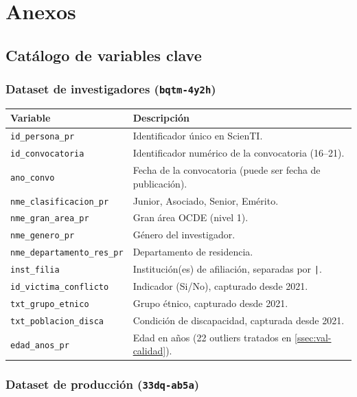 \documentclass[11pt,a4paper,oneside]{article}
\begin{document}
\appendix
\section*{Anexos}
\renewcommand{\thesubsection}{\Alph{subsection}}

\subsection{Catálogo de variables clave}

\subsubsection*{Dataset de investigadores (\texttt{bqtm-4y2h})}

\begin{tabularx}{\linewidth}{l X}
\toprule
\textbf{Variable} & \textbf{Descripción} \\
\midrule
\texttt{id\_persona\_pr} & Identificador único en ScienTI. \\
\texttt{id\_convocatoria} & Identificador numérico de la convocatoria (16--21). \\
\texttt{ano\_convo} & Fecha de la convocatoria (puede ser fecha de publicación). \\
\texttt{nme\_clasificacion\_pr} & Junior, Asociado, Senior, Emérito. \\
\texttt{nme\_gran\_area\_pr} & Gran área OCDE (nivel 1). \\
\texttt{nme\_genero\_pr} & Género del investigador. \\
\texttt{nme\_departamento\_res\_pr} & Departamento de residencia. \\
\texttt{inst\_filia} & Institución(es) de afiliación, separadas por \texttt{|}. \\
\texttt{id\_victima\_conflicto} & Indicador (Si/No), capturado desde 2021. \\
\texttt{txt\_grupo\_etnico} & Grupo étnico, capturado desde 2021. \\
\texttt{txt\_poblacion\_disca} & Condición de discapacidad, capturada desde 2021. \\
\texttt{edad\_anos\_pr} & Edad en años (22 outliers tratados en \ref{ssec:val-calidad}). \\
\bottomrule
\end{tabularx}

\subsubsection*{Dataset de producción (\texttt{33dq-ab5a})}
\end{document}
